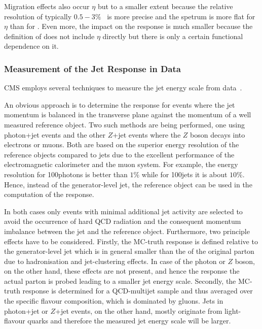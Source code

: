 Migration effects also occur \wrt $\eta$ but to a smaller extent because the relative resolution of typically \mbox{$0.5-3\%$}~\cite{CMS-PAS-JME-10-003} is more precise and the spetrum is more flat for $\eta$ than for \pt.
Even more, the impact on the response is much smaller because the definition of \resp does not include $\eta$ directly but there is only a certain functional dependence on it.



\subsubsection{Measurement of the Jet Response in Data} \label{sec:Jets:JEC:}
CMS employs several techniques to measure the jet energy scale from data~\cite{1748-0221-6-11-P11002}.

An obvious approach is to determine the response for events where the jet momentum is balanced in the transverse plane against the momentum of a well measured reference object.
Two such methods are being performed, one using photon+jet events and the other $Z$+jet events where the $Z$ boson decays into electrons or muons.
Both are based on the superior energy resolution of the reference objects compared to jets due to the excellent performance of the electromagnetic calorimeter and the muon system.
For example, the energy resolution for 100\gev photons is better than $1\%$ while for 100\gev jets it is about $10\%$.
Hence, instead of the generator-level jet, the reference object can be used in the computation  of the response.

In both cases only events with minimal additional jet activity are selected to avoid the occurrence of hard QCD radiation and the consequent momentum imbalance between the jet and the reference object.
Furthermore, two principle effects have to be considered.
Firstly, the MC-truth response is defined relative to the generator-level jet \pt which is in general smaller than the \pt of the original parton due to hadronisation and jet-clustering effects.
In case of the photon or $Z$ boson, on the other hand, these effects are not present, and hence the response \wrt the actual parton \pt is probed leading to a smaller jet energy scale.
Secondly, the MC-truth response is determined for a QCD-multijet sample and thus averaged over the specific flavour composition, which is dominated by gluons.
Jets in photon+jet or $Z$+jet events, on the other hand, mostly originate from light-flavour quarks and therefore the measured jet energy scale will be larger.


